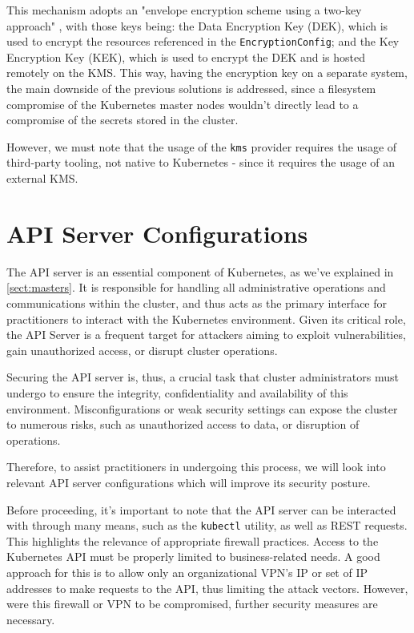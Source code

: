 \documentclass[a4paper,11pt,openright,BCOR=15mm]{scrbook}
\begin{document}
This mechanism adopts an "envelope encryption scheme using a two-key approach" \cite{gkatziouras_kubernetes_2024}, with those keys being: the Data Encryption Key (DEK), which is used to encrypt the resources referenced in the \texttt{EncryptionConfig}; and the Key Encryption Key (KEK), which is used to encrypt the DEK and is hosted remotely on the KMS. This way, having the encryption key on a separate system, the main downside of the previous solutions is addressed, since a filesystem compromise of the Kubernetes master nodes wouldn't directly lead to a compromise of the secrets stored in the cluster.

However, we must note that the usage of the \texttt{kms} provider requires the usage of third-party tooling, not native to Kubernetes - since it requires the usage of an external KMS. 


	\section{API Server Configurations}
	
The API server is an essential component of Kubernetes, as we've explained in \ref{sect:masters}. It is responsible for handling all administrative operations and communications within the cluster, and thus acts as the primary interface for practitioners to interact with the Kubernetes environment. Given its critical role, the API Server is a frequent target for attackers aiming to exploit vulnerabilities, gain unauthorized access, or disrupt cluster operations.

Securing the API server is, thus, a crucial task that cluster administrators must undergo to ensure the integrity, confidentiality and availability of this environment. Misconfigurations or weak security settings can expose the cluster to numerous risks, such as unauthorized access to data, or disruption of operations.

Therefore, to assist practitioners in undergoing this process, we will look into relevant API server configurations which will improve its security posture.

Before proceeding, it's important to note that the API server can be interacted with through many means, such as the \texttt{kubectl} utility, as well as REST requests. This highlights the relevance of appropriate firewall practices. Access to the Kubernetes API must be properly limited to business-related needs. A good approach for this is to allow only an organizational VPN's IP or set of IP addresses to make requests to the API, thus limiting the attack vectors. However, were this firewall or VPN to be compromised, further security measures are necessary.
\end{document}
